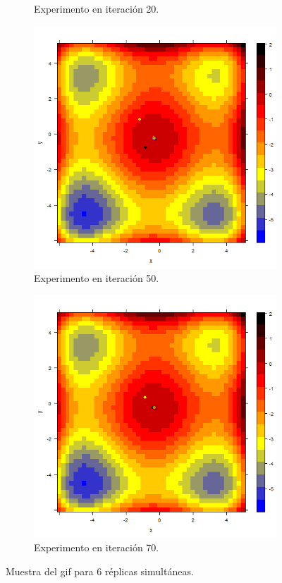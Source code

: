 \documentclass{article}
\begin{document}
\begin{figure}[H]
\begin{subfigure}[b]{0.45\linewidth}
		\caption{Experimento en iteración 20.}
		\label{2}
	\end{subfigure}
	\begin{subfigure}[b]{0.45\linewidth}
		\includegraphics[width=\linewidth]{f1n050.png}
		\caption{Experimento en iteración 50.}
		\label{3}
	\end{subfigure}
	\begin{subfigure}[b]{0.45\linewidth}
		\includegraphics[width=\linewidth]{f1n070.png}
		\caption{Experimento en iteración 70.}
		\label{4}
	\end{subfigure}
	\caption{Muestra del gif para 6 réplicas simultáneas.}  		
\end{figure}
\end{document}
